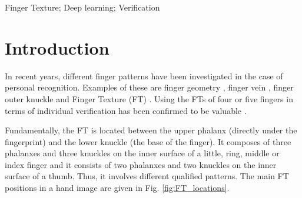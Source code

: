 \documentclass[conference]{IEEEtran}
\begin{document}
\begin{IEEEkeywords}
Finger Texture; Deep learning; Verification
\end{IEEEkeywords}

\section{Introduction}
In recent years, different finger patterns have been investigated in the case of personal recognition. Examples of these are finger geometry \cite{Liu2015Hand}, finger vein \cite{Lu2014Finger}, finger outer knuckle \cite{Kumar2014Importance} and Finger Texture (FT) \cite{Al-Nima2017finger} \cite{Al-Nima2017Robust}. Using the FTs of four or five fingers in terms of individual verification has been confirmed to be valuable \cite{Al-Nima2017efficient} \cite{Al-Nima2016ANovel} \cite{Al-Nima2015Human}. 

Fundamentally, the FT is located between the upper phalanx (directly under the fingerprint) and the lower knuckle (the base of the finger). It composes of three phalanxes and three knuckles on the inner surface of a little, ring, middle or index finger and it consists of two phalanxes and two knuckles on the inner surface of a thumb. Thus, it involves different qualified patterns. The main FT positions in a hand image are given in Fig. \ref{fig:FT_locations}. 
\end{document}
